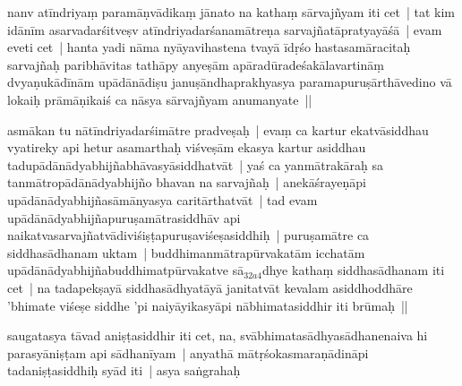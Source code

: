\documentclass[article,12pt,a4paper]{memoir}%
\newcounter{parCount}
\begin{document}
	  
	  \pstart \leavevmode%
	\label{thakur75-56.19}nanv atīndriyaṃ paramāṇvādikaṃ jānato na kathaṃ sārvajñyam iti cet | tat kim idānīm asarvadarśitveṣv atīndriyadarśanamātreṇa sarvajñatāpratyayāśā | evam eveti cet | hanta yadi nāma nyāyavihastena tvayā īdṛśo hastasamāracitaḥ sarvajñaḥ paribhāvitas tathāpy anyeṣām apāradūradeśakālavartināṃ dvyaṇukādīnām upādānādiṣu januṣāndhaprakhyasya paramapuruṣārthāvedino vā lokaiḥ prāmāṇikaiś ca nāsya sārvajñyam anumanyate ||
	{}
	\pend%
      

	  
	  \pstart \leavevmode%
	\label{thakur75-56.24}asmākan tu nātīndriyadarśimātre pradveṣaḥ | evaṃ ca kartur ekatvāsiddhau vyatireky api hetur asamarthaḥ viśveṣām ekasya kartur asiddhau tadupādānādyabhijñabhāvasyāsiddhatvāt | yaś ca yanmātrakāraḥ sa tanmātropādānādyabhijño bhavan na sarvajñaḥ | anekāśrayeṇāpi upādānādyabhijñasāmānyasya caritārthatvāt | tad evam upādānādyabhijñapuruṣamātrasiddhāv api naikatvasarvajñatvādiviśiṣṭapuruṣaviśeṣasiddhiḥ | puruṣamātre ca siddhasādhanam uktam | buddhimanmātrapūrvakatām icchatām upādānādyabhijñabuddhimatpūrvakatve sā{\tiny $_{32a4}$}dhye kathaṃ \label{ratnakīrtinibandhāvali__36r1NMNKPK8I8K079OIC2E8BVU5}siddhasādhanam\label{ratnakīrtinibandhāvali__36r1NMNKPKAMZXOQ29O4V14D9F6} iti cet | na tadapekṣayā siddhasādhyatāyā janitatvāt kevalam asiddhoddhāre 'bhimate viśeṣe siddhe 'pi naiyāyikasyāpi nābhimatasiddhir iti brūmaḥ ||
	{}
	\pend%
      

	  
	  \pstart \leavevmode%
	\label{thakur75-57.3}saugatasya tāvad aniṣṭasiddhir iti cet, na, svābhimatasādhyasādhanenaiva hi parasyāniṣṭam api sādhanīyam | anyathā mātṛśokasmaraṇādināpi tadaniṣṭasiddhiḥ syād iti | asya saṅgrahaḥ
	{}
	\pend%
      
\end{document}
